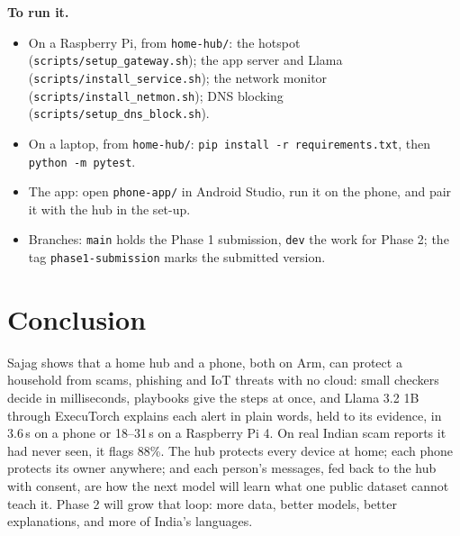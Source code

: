 \documentclass[11pt,a4paper]{article}
\newcommand{\code}[1]{\texttt{#1}}
\begin{document}
\textbf{To run it.}
\begin{itemize}[leftmargin=*]\raggedright
  \item On a Raspberry Pi, from \code{home-hub/}: the hotspot (\code{scripts/setup\_gateway.sh}); the app server and
        Llama (\code{scripts/install\_service.sh}); the network monitor (\code{scripts/install\_netmon.sh}); DNS blocking
        (\code{scripts/setup\_dns\_block.sh}).
  \item On a laptop, from \code{home-hub/}: \code{pip install -r requirements.txt}, then \code{python -m pytest}.
  \item The app: open \code{phone-app/} in Android Studio, run it on the phone, and pair it with the hub in the set-up.
  \item Branches: \code{main} holds the Phase 1 submission, \code{dev} the work for Phase 2; the tag
        \code{phase1-submission} marks the submitted version.
\end{itemize}

\section{Conclusion}

Sajag shows that a home hub and a phone, both on Arm, can protect a household from scams, phishing and IoT threats with
no cloud: small checkers decide in milliseconds, playbooks give the steps at once, and Llama 3.2 1B through ExecuTorch
explains each alert in plain words, held to its evidence, in 3.6\,s on a phone or 18--31\,s on a Raspberry Pi 4. On real
Indian scam reports it had never seen, it flags 88\%. The hub protects every device at home; each phone protects its owner
anywhere; and each person's messages, fed back to the hub with consent, are how the next model will learn what one public
dataset cannot teach it. Phase 2 will grow that loop: more data, better models, better explanations, and more of India's
languages.

\end{document}
